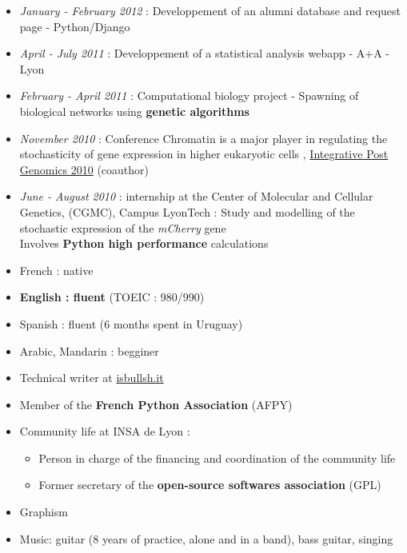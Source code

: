\begin{itemize}
\renewcommand{\labelitemi}{$\circ$}
	\item \emph{January - February 2012} : Developpement of an alumni database and request page - Python/Django
	\item \emph{April - July 2011} : Developpement of a statistical analysis webapp - A+A - Lyon
	\item \textit{February - April 2011} : Computational biology project - Spawning of biological networks using \textbf{genetic algorithms}
    \item \textit{November 2010} : Conference \og Chromatin is a major player in regulating the stochasticity of gene expression in higher eukaryotic cells \fg{}, \href{http://ipg.insa-lyon.fr/}{Integrative Post Genomics 2010} (coauthor)
    \item \textit{June - August 2010} : internship at the Center of Molecular and Cellular Genetics, (CGMC), Campus LyonTech : \og Study and modelling of the stochastic expression of the \textit{mCherry} gene\fg{} \\Involves \textbf{Python high performance} calculations
\end{itemize}

    \begin{itemize}
    \renewcommand{\labelitemi}{$\circ$}
    \item French : native
    \item \textbf{English : fluent} (TOEIC : 980/990)
    \item Spanish : fluent (6 months spent in Uruguay) 
    \item Arabic, Mandarin : begginer
\end{itemize}
    
\begin{itemize}
\renewcommand{\labelitemi}{$\circ$}
	\item Technical writer at \href{http://isbullsh.it}{isbullsh.it}
	\item Member of the \textbf{French Python Association} (AFPY) 
	\item Community life at INSA de Lyon :
	\begin{itemize}
		\item Person in charge of the financing and coordination of the community life
		\item Former secretary of the \textbf{open-source softwares association} (GPL) 
	\end{itemize}
    \item Graphism
    \item Music: guitar (8 years of practice, alone and in a band), bass guitar, singing    
\end{itemize}

